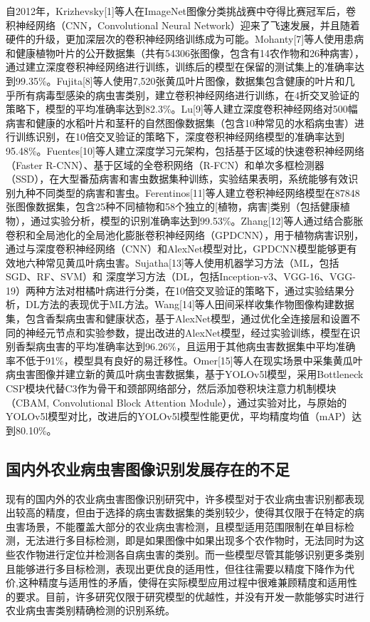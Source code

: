 \documentclass[12pt, a4paper, twoside]{ctexart}
\begin{document}
自2012年，Krizhevsky[1]等人在ImageNet图像分类挑战赛中夺得比赛冠军后，卷积神经网络（CNN，Convolutional Neural Network）迎来了飞速发展，并且随着硬件的升级，更加深层次的卷积神经网络训练成为可能。Mohanty[7]等人使用患病和健康植物叶片的公开数据集（共有54306张图像，包含有14农作物和26种病害），通过建立深度卷积神经网络进行训练，训练后的模型在保留的测试集上的准确率达到99.35\%。Fujita[8]等人使用7,520张黄瓜叶片图像，数据集包含健康的叶片和几乎所有病毒型感染的病虫害类别，建立卷积神经网络进行训练，在4折交叉验证的策略下，模型的平均准确率达到82.3\%。Lu[9]等人建立深度卷积神经网络对500幅病害和健康的水稻叶片和茎秆的自然图像数据集（包含10种常见的水稻病虫害）进行训练识别，在10倍交叉验证的策略下，深度卷积神经网络模型的准确率达到95.48\%。Fuentes[10]等人建立深度学习元架构，包括基于区域的快速卷积神经网络（Faster R-CNN）、基于区域的全卷积网络（R-FCN）和单次多框检测器（SSD），在大型番茄病害和害虫数据集种训练，实验结果表明，系统能够有效识别九种不同类型的病害和害虫。Ferentinos[11]等人建立卷积神经网络模型在87848张图像数据集，包含25种不同植物和58个独立的[植物，病害]类别（包括健康植物），通过实验分析，模型的识别准确率达到99.53\%。Zhang[12]等人通过结合膨胀卷积和全局池化的全局池化膨胀卷积神经网络（GPDCNN），用于植物病害识别，通过与深度卷积神经网络（CNN）和AlexNet模型对比，GPDCNN模型能够更有效地六种常见黄瓜叶病虫害。Sujatha[13]等人使用机器学习方法（ML，包括SGD、RF、SVM）和 深度学习方法（DL，包括Inception-v3、VGG-16、VGG-19）两种方法对柑橘叶病进行分类，在10倍交叉验证的策略下，通过实验结果分析，DL方法的表现优于ML方法。Wang[14]等人田间采样收集作物图像构建数据集，包含香梨病虫害和健康状态，基于AlexNet模型，通过优化全连接层和设置不同的神经元节点和实验参数，提出改进的AlexNet模型，经过实验训练，模型在识别香梨病虫害的平均准确率达到96.26\%，且运用于其他病虫害数据集中平均准确率不低于91\%，模型具有良好的易迁移性。Omer[15]等人在现实场景中采集黄瓜叶病虫害图像并建立新的黄瓜叶病虫害数据集，基于YOLOv5l模型，采用Bottleneck CSP模块代替C3作为骨干和颈部网络部分，然后添加卷积块注意力机制模块（CBAM, Convolutional Block Attention Module），通过实验对比，与原始的YOLOv5l模型对比，改进后的YOLOv5l模型性能更优，平均精度均值（mAP）达到80.10\%。


\subsection{国内外农业病虫害图像识别发展存在的不足}

现有的国内外的农业病虫害图像识别研究中，许多模型对于农业病虫害识别都表现出较高的精度，但由于选择的病虫害数据集的类别较少，使得其仅限于在特定的病虫害场景，不能覆盖大部分的农业病虫害检测，且模型适用范围限制在单目标检测，无法进行多目标检测，即是如果图像中如果出现多个农作物时，无法同时为这些农作物进行定位并检测各自病虫害的类别。而一些模型尽管其能够识别更多类别且能够进行多目标检测，表现出更优良的适用性，但往往需要以精度下降作为代价,这种精度与适用性的矛盾，使得在实际模型应用过程中很难兼顾精度和适用性的要求。目前，许多研究仅限于研究模型的优越性，并没有开发一款能够实时进行农业病虫害类别精确检测的识别系统。
\end{document}
